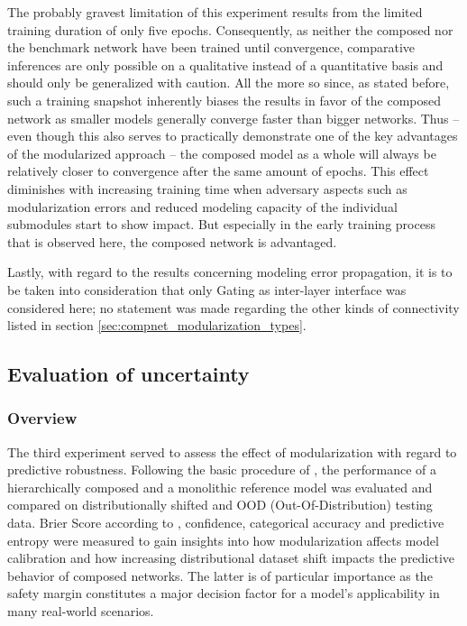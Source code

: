 The probably gravest limitation of this experiment results from the limited training duration of only five epochs. Consequently, as neither the composed nor the benchmark network have been trained until convergence, comparative inferences are only possible on a qualitative instead of a quantitative basis and should only be generalized with caution. All the more so since, as stated before, such a training snapshot inherently biases the results in favor of the composed network as smaller models generally converge faster than bigger networks. Thus -- even though this also serves to practically demonstrate one of the key advantages of the modularized approach -- the composed model as a whole will always be relatively closer to convergence after the same amount of epochs. This effect diminishes with increasing training time when adversary aspects such as modularization errors and reduced modeling capacity of the individual submodules start to show impact. But especially in the early training process that is observed here, the composed network is advantaged.

Lastly, with regard to the results concerning modeling error propagation, it is to be taken into consideration that only Gating as inter-layer interface was considered here; no statement was made regarding the other kinds of connectivity listed in section \ref{sec:compnet_modularization_types}.

\subsection{Evaluation of uncertainty%
            \label{sec:experiments_uncertainty}}
            
\subsubsection{Overview%
               \label{sec:experiments_uncertainty_overview}}
               
The third experiment served to assess the effect of modularization with regard to predictive robustness. Following the basic procedure of \cite{Ovadia2019-zt}, the performance of a hierarchically composed and a monolithic reference model was evaluated and compared on distributionally shifted and OOD (Out-Of-Distribution) testing data. Brier Score according to \cite{Brier1950-jb}, confidence, categorical accuracy and predictive entropy were measured to gain insights into how modularization affects model calibration and how increasing distributional dataset shift impacts the predictive behavior of composed networks. The latter is of particular importance as the safety margin constitutes a major decision factor for a model's applicability in many real-world scenarios.
               
